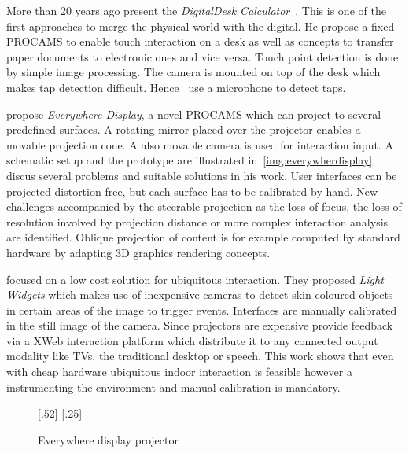 More than 20 years ago \citeauthor{Wellner:1991ws} present the \textit{DigitalDesk Calculator}~\cite{Wellner:1991ws}. This is one of the first approaches to merge the physical world with the digital. He propose a fixed \ac{PROCAMS} to enable touch interaction on a desk as well as concepts to transfer paper documents to electronic ones and vice versa. Touch point detection is done by simple image processing. The camera is mounted on top of the desk which makes tap detection difficult. Hence~\citeauthor{Wellner:1991ws} use a microphone to detect taps. 

\textcite{Pinhanez:2001vn} propose \textit{Everywhere Display}, a novel \ac{PROCAMS} which can project to several predefined surfaces. A rotating mirror placed over the projector enables a movable projection cone. A also movable camera is used for interaction input. A schematic setup and the prototype are illustrated in~\autoref{img:everywherdisplay}.~\citeauthor{Pinhanez:2001vn} discus several problems and suitable solutions in his work. User interfaces can be projected distortion free, but  each surface has to be calibrated by hand. New challenges accompanied by the steerable projection as the loss of focus, the loss of resolution involved by projection distance or more complex interaction analysis are identified. Oblique projection of content is for example computed by standard hardware by adapting 3D graphics rendering concepts. 

\textcite{Fails:2002du} focused on a low cost solution for ubiquitous interaction. They proposed \textit{Light Widgets} which makes use of inexpensive cameras to detect skin coloured objects in certain areas of the image to trigger events. Interfaces are manually calibrated in the still image of the camera. Since projectors are expensive \citeauthor{Fails:2002du} provide feedback via a XWeb interaction platform which distribute it to any connected output modality like TVs, the traditional desktop or speech. This work shows that even with cheap hardware ubiquitous indoor interaction is feasible however a instrumenting the environment and manual calibration is mandatory.

\begin{figure}
        \centering
[.52\textwidth]{\def\svgwidth{.60\textwidth} 
{\selectfont {ep01.pdf_tex}}}
\hfill
	[.25\linewidth]{\def\svgwidth{0.25\textwidth} {\selectfont {ep02.pdf_tex}}}
        \caption{Everywhere display projector \cite{Pinhanez:2001vn}}
        \label{img:everywherdisplay}
\end{figure}


